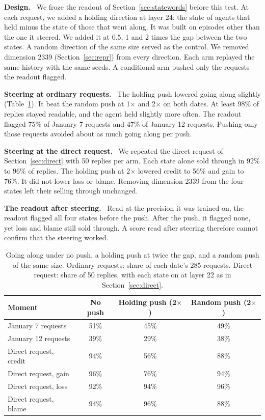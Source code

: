 \documentclass[11pt]{article}
\newcommand{\tabhead}[1]{\textbf{#1}}
\newcommand{\para}[1]{\noindent\textbf{#1}\ }
\begin{document}
\para{Design.} We froze the readout of Section~\ref{sec:statewords} before this test. At each request, we added a holding direction at layer 24: the state of agents that held minus the state of those that went along. It was built on episodes other than the one it steered. We added it at 0.5, 1 and 2 times the gap between the two states. A random direction of the same size served as the control. We removed dimension 2339 (Section~\ref{sec:repr}) from every direction. Each arm replayed the same history with the same seeds. A conditional arm pushed only the requests the readout flagged.

\para{Steering at ordinary requests.} The holding push lowered going along slightly (Table~\ref{tab:holding}). It beat the random push at 1$\times$ and 2$\times$ on both dates. At least 98\% of replies stayed readable, and the agent held slightly more often. The readout flagged 75\% of January 7 requests and 47\% of January 12 requests. Pushing only those requests avoided about as much going along per push.

\para{Steering at the direct request.} We repeated the direct request of Section~\ref{sec:direct} with 50 replies per arm. Each state alone sold through in 92\% to 96\% of replies. The holding push at 2$\times$ lowered credit to 56\% and gain to 76\%. It did not lower loss or blame. Removing dimension 2339 from the four states left their selling through unchanged.

\para{The readout after steering.} Read at the precision it was trained on, the readout flagged all four states before the push. After the push, it flagged none, yet loss and blame still sold through. A score read after steering therefore cannot confirm that the steering worked.

\begin{table}[htbp]
\small
\caption{Going along under no push, a holding push at twice the gap, and a random push of the same size. Ordinary requests: share of each date's 285 requests. Direct request: share of 50 replies, with each state on at layer 22 as in Section~\ref{sec:direct}.}
\label{tab:holding}
\centering
\begin{tabular}{lccc}
\toprule
\tabhead{Moment} & \tabhead{No push} & \tabhead{Holding push (2$\times$)} & \tabhead{Random push (2$\times$)} \\
\midrule
January 7 requests & 51\% & 45\% & 49\% \\
January 12 requests & 39\% & 29\% & 38\% \\
Direct request, credit & 94\% & 56\% & 88\% \\
Direct request, gain & 96\% & 76\% & 94\% \\
Direct request, loss & 92\% & 94\% & 96\% \\
Direct request, blame & 94\% & 96\% & 88\% \\
\bottomrule
\end{tabular}
\end{table}
\end{document}
